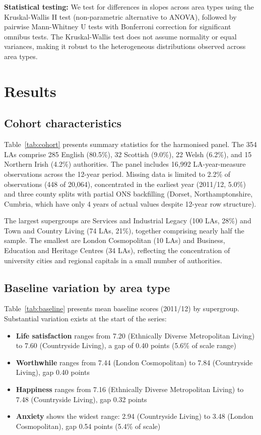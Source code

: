 \documentclass[12pt,a4paper]{article}
\begin{document}
\textbf{Statistical testing:} We test for differences in slopes across area types using the Kruskal-Wallis H test (non-parametric alternative to ANOVA), followed by pairwise Mann-Whitney U tests with Bonferroni correction for significant omnibus tests. The Kruskal-Wallis test does not assume normality or equal variances, making it robust to the heterogeneous distributions observed across area types.

\section{Results}

\subsection{Cohort characteristics}

Table~\ref{tab:cohort} presents summary statistics for the harmonised panel. The 354 LAs comprise 285 English (80.5\%), 32 Scottish (9.0\%), 22 Welsh (6.2\%), and 15 Northern Irish (4.2\%) authorities. The panel includes 16,992 LA-year-measure observations across the 12-year period. Missing data is limited to 2.2\% of observations (448 of 20,064), concentrated in the earliest year (2011/12, 5.0\%) and three county splits with partial ONS backfilling (Dorset, Northamptonshire, Cumbria, which have only 4 years of actual values despite 12-year row structure).

The largest supergroups are Services and Industrial Legacy (100 LAs, 28\%) and Town and Country Living (74 LAs, 21\%), together comprising nearly half the sample. The smallest are London Cosmopolitan (10 LAs) and Business, Education and Heritage Centres (34 LAs), reflecting the concentration of university cities and regional capitals in a small number of authorities.

\subsection{Baseline variation by area type}

Table~\ref{tab:baseline} presents mean baseline scores (2011/12) by supergroup. Substantial variation exists at the start of the series:

\begin{itemize}
\item \textbf{Life satisfaction} ranges from 7.20 (Ethnically Diverse Metropolitan Living) to 7.60 (Countryside Living), a gap of 0.40 points (5.6\% of scale range)
\item \textbf{Worthwhile} ranges from 7.44 (London Cosmopolitan) to 7.84 (Countryside Living), gap 0.40 points
\item \textbf{Happiness} ranges from 7.16 (Ethnically Diverse Metropolitan Living) to 7.48 (Countryside Living), gap 0.32 points
\item \textbf{Anxiety} shows the widest range: 2.94 (Countryside Living) to 3.48 (London Cosmopolitan), gap 0.54 points (5.4\% of scale)
\end{itemize}
\end{document}
